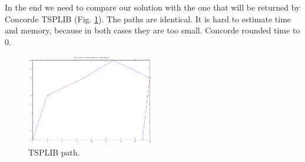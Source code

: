 \documentclass[a4paper, 12pt]{article}
\begin{document}
In the end we need to compare our solution with the one that will be returned by Concorde TSPLIB (Fig. \ref{pathConcorde}). The paths are identical. It is hard to estimate time and memory, because in both cases they are too small. Concorde rounded time to 0.

\begin{figure}[h]
  \centering
  \caption{TSPLIB path.\label{pathConcorde}}
  \includegraphics[width=0.5\textwidth]{pathConcorde}
\end{figure}
\end{document}
